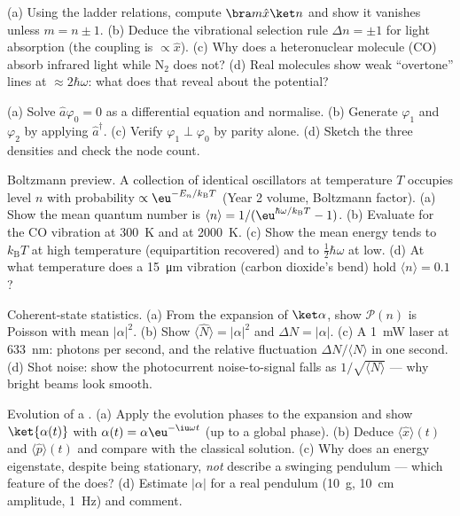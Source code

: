 \begin{exercise}[$\star$]\label{exo:b3:harmonic-oscillator:4}
(a) Using the ladder relations, compute $\bra m\hat x\ket n$ and
show it vanishes unless $m = n \pm 1$. (b) Deduce the vibrational
selection rule $\Delta n = \pm1$ for light absorption (the coupling
is $\propto\hat x$). (c) Why does a heteronuclear molecule (CO)
absorb infrared light while N$_2$ does not? (d) Real molecules show
weak ``overtone'' lines at $\approx 2\hbar\omega$: what does that
reveal about the potential?
\end{exercise}

\begin{exercise}[$\star\star$]\label{exo:b3:harmonic-oscillator:5}
(a) Solve $\hat a\varphi_0 = 0$ as a differential equation and
normalise. (b) Generate $\varphi_1$ and $\varphi_2$ by applying
$\hat a^\dagger$. (c) Verify $\varphi_1 \perp \varphi_0$ by parity
alone. (d) Sketch the three densities and check the node count.
\end{exercise}

\begin{exercise}[$\star\star$]\label{exo:b3:harmonic-oscillator:6}
Boltzmann preview. A collection of identical oscillators at
temperature $T$ occupies level $n$ with probability $\propto
\eu^{-E_n/k_{\text{B}}T}$ (Year 2 volume, Boltzmann factor). (a)
Show the mean quantum number is $\langle n\rangle =
1/(\eu^{\hbar\omega/k_{\text{B}}T} - 1)$. (b) Evaluate for the CO
vibration at \qty{300}{K} and at \qty{2000}{K}. (c) Show the mean
energy tends to $k_{\text{B}}T$ at high temperature (equipartition
recovered) and to $\tfrac12\hbar\omega$ at low. (d) At what
temperature does a \qty{15}{\micro m} vibration (carbon dioxide's
bend) hold $\langle n\rangle = 0.1$?
\end{exercise}

\begin{exercise}[$\star\star$]\label{exo:b3:harmonic-oscillator:7}
Coherent-state statistics. (a) From the expansion of $\ket\alpha$,
show $\mathcal P(n)$ is Poisson with mean $|\alpha|^2$. (b) Show
$\langle\hat N\rangle = |\alpha|^2$ and $\Delta N = |\alpha|$. (c) A
\qty{1}{mW} laser at \qty{633}{nm}: photons per second, and the
relative fluctuation $\Delta N/\langle N\rangle$ in one second. (d)
Shot noise: show the photocurrent noise-to-signal falls as
$1/\sqrt{\langle N\rangle}$ --- why bright beams look smooth.
\end{exercise}

\begin{exercise}[$\star\star$]\label{exo:b3:harmonic-oscillator:8}
Evolution of a . (a) Apply the evolution phases to the
expansion and show $\ket{\alpha(t)}$ with $\alpha(t) =
\alpha\eu^{-\iu\omega t}$ (up to a global phase). (b) Deduce
$\langle\hat x\rangle(t)$ and $\langle\hat p\rangle(t)$ and compare
with the classical solution. (c) Why does an energy eigenstate,
despite being stationary, \emph{not} describe a swinging pendulum
--- which feature of the  does? (d) Estimate $|\alpha|$
for a real pendulum (\qty{10}{g}, \qty{10}{cm} amplitude,
\qty{1}{Hz}) and comment.
\end{exercise}

